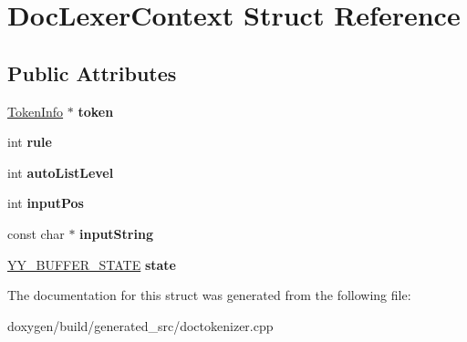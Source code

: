 \hypertarget{struct_doc_lexer_context}{}\section{Doc\+Lexer\+Context Struct Reference}
\label{struct_doc_lexer_context}
\subsection*{Public Attributes}
\begin{DoxyCompactItemize}
\item 
\mbox{\label{struct_doc_lexer_context_a0d0279acd580f1391253e0cb4de291d6}} 
\mbox{\hyperlink{struct_token_info}{Token\+Info}} $\ast$ {\bfseries token}
\item 
\mbox{\label{struct_doc_lexer_context_af2e9a68a5dac05327ccc406c1a8e2669}} 
int {\bfseries rule}
\item 
\mbox{\label{struct_doc_lexer_context_af642c9d98d61a5f08c615d79a0c4fcd1}} 
int {\bfseries auto\+List\+Level}
\item 
\mbox{\label{struct_doc_lexer_context_a427c0399bce8e80117f6133f1fc211e8}} 
int {\bfseries input\+Pos}
\item 
\mbox{\label{struct_doc_lexer_context_a2635bb7ec48f95756b72f5ce53d19500}} 
const char $\ast$ {\bfseries input\+String}
\item 
\mbox{\label{struct_doc_lexer_context_aff59ac36da3634c543277ef8b5575aca}} 
\mbox{\hyperlink{structyy__buffer__state}{Y\+Y\+\_\+\+B\+U\+F\+F\+E\+R\+\_\+\+S\+T\+A\+TE}} {\bfseries state}
\end{DoxyCompactItemize}


The documentation for this struct was generated from the following file\+:\begin{DoxyCompactItemize}
\item 
doxygen/build/generated\+\_\+src/doctokenizer.\+cpp\end{DoxyCompactItemize}
